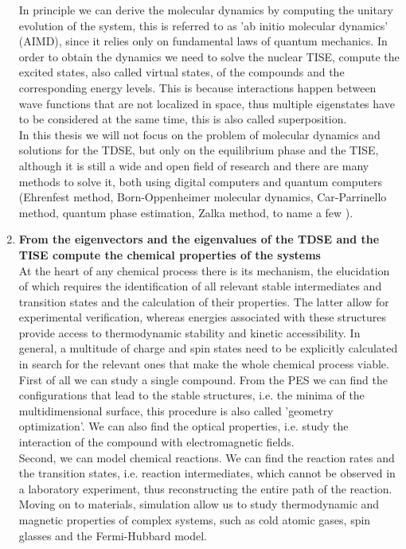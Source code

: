 \begin{enumerate}
  In principle we can derive the molecular dynamics by computing the unitary evolution of the system, this is referred to as 'ab initio molecular dynamics' (AIMD), since it relies only on fundamental laws of quantum mechanics. In order to obtain the dynamics we need to solve the nuclear TISE, compute the excited states, also called virtual states, of the compounds and the corresponding energy levels. This is because interactions happen between wave functions that are not localized in space, thus multiple eigenstates have to be considered at the same time, this is also called superposition. \\
  In this thesis we will not focus on the problem of molecular dynamics and solutions for the TDSE, but only on the equilibrium phase and the TISE, although it is still a wide and open field of research and there are many methods to solve it, both using digital computers and quantum computers (Ehrenfest method, Born-Oppenheimer molecular dynamics, Car-Parrinello method, quantum phase estimation, Zalka method, to name a few \cite{Poirier2020}).
  
  \item \textbf{From the eigenvectors and the eigenvalues of the TDSE and the TISE compute the chemical properties of the systems} \\
  At the heart of any chemical process there is its mechanism, the elucidation of which requires the identification of all relevant stable intermediates and transition states and the calculation of their properties. The latter allow for experimental verification, whereas energies associated with these structures provide access to thermodynamic stability and kinetic accessibility. In general, a multitude of charge and spin states need to be explicitly calculated in search for the relevant ones that make the whole chemical process viable. \\
  First of all we can study a single compound. From the PES we can find the configurations that lead to the stable structures, i.e. the minima of the multidimensional surface, this procedure is also called 'geometry optimization'. We can also find the optical properties, i.e. study the interaction of the compound with electromagnetic fields. \\
  Second, we can model chemical reactions. We can find the reaction rates and the transition states, i.e. reaction intermediates, which cannot be observed in a laboratory experiment, thus reconstructing the entire path of the reaction. \\
  Moving on to materials, simulation allow us to study thermodynamic and magnetic properties of complex systems, such as cold atomic gases, spin glasses and the Fermi-Hubbard model.
  

\end{enumerate}
